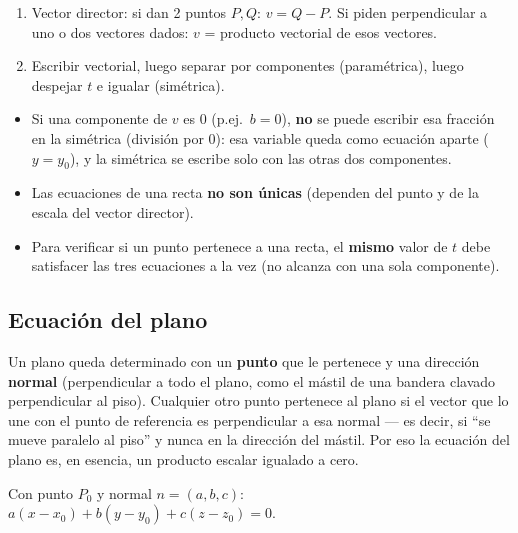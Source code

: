 \documentclass[11pt,a4paper]{article}
\begin{document}
\begin{proc}
\begin{enumerate}
    \item Vector director: si dan 2 puntos $P,Q$: $v=Q-P$. Si piden perpendicular a uno o
    dos vectores dados: $v$ = producto vectorial de esos vectores.
    \item Escribir vectorial, luego separar por componentes (paramétrica), luego despejar
    $t$ e igualar (simétrica).
\end{enumerate}
\end{proc}

\begin{atencion}
\begin{itemize}
    \item Si una componente de $v$ es 0 (p.ej.\ $b=0$), \textbf{no} se puede escribir esa
    fracción en la simétrica (división por 0): esa variable queda como ecuación aparte
    ($y=y_0$), y la simétrica se escribe solo con las otras dos componentes.
    \item Las ecuaciones de una recta \textbf{no son únicas} (dependen del punto y de la
    escala del vector director).
    \item Para verificar si un punto pertenece a una recta, el \textbf{mismo} valor de $t$
    debe satisfacer las tres ecuaciones a la vez (no alcanza con una sola componente).
\end{itemize}
\end{atencion}

\subsection{Ecuación del plano}

\begin{intuicion}
Un plano queda determinado con un \textbf{punto} que le pertenece y una dirección
\textbf{normal} (perpendicular a todo el plano, como el mástil de una bandera clavado
perpendicular al piso). Cualquier otro punto pertenece al plano si el vector que lo une
con el punto de referencia es perpendicular a esa normal — es decir, si ``se mueve
paralelo al piso'' y nunca en la dirección del mástil. Por eso la ecuación del plano es,
en esencia, un producto escalar igualado a cero.
\end{intuicion}

\begin{teoria}
Con punto $P_0$ y normal $n=(a,b,c)$: $a(x-x_0)+b(y-y_0)+c(z-z_0)=0$.
\end{teoria}
\end{document}
